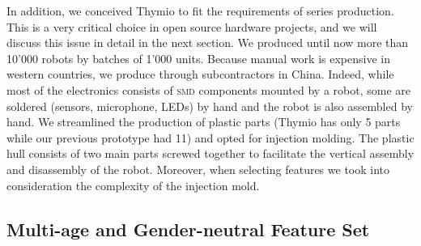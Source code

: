 \documentclass[letterpaper, 10 pt, conference]{ieeeconf}  %
\begin{document}
In addition, we conceived Thymio to fit the requirements of series production.
This is a very critical choice in open source hardware projects, and we will discuss this issue in detail in the next section.
We produced until now more than 10'000 robots by batches of 1'000 units.
Because manual work is expensive in western countries, we produce through subcontractors in China.
Indeed, while most of the electronics consists of \textsc{smd} components mounted by a robot, some are soldered (sensors, microphone, LEDs) by hand and the robot is also assembled by hand.
We streamlined the production of plastic parts (Thymio has only 5 parts while our previous prototype had 11) and opted for injection molding. 
The plastic hull consists of two main parts screwed together to facilitate the vertical assembly and disassembly of the robot.
Moreover, when selecting features we took into consideration the complexity of the injection mold.

\subsection{Multi-age and Gender-neutral Feature Set}
\end{document}
